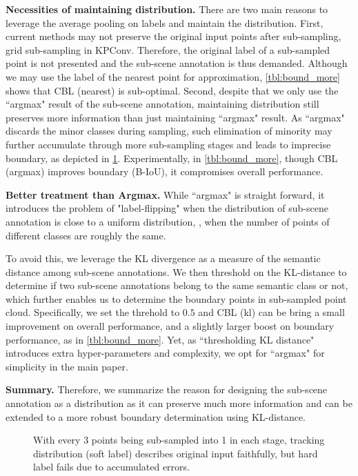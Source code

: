 \documentclass[10pt,twocolumn,letterpaper]{article}
\begin{document}
\noindent\textbf{Necessities of maintaining distribution.}
There are two main reasons to leverage the average pooling on labels and maintain the distribution. First, current methods may not preserve the original input points after sub-sampling, \eg grid sub-sampling in KPConv\cite{kpconv}. Therefore, the original label of a sub-sampled point is not presented and the sub-scene annotation is thus demanded. Although we may use the label of the nearest point for approximation, \cref{tbl:bound_more} shows that CBL (nearest) is sub-optimal. Second, despite that we only use the ``argmax" result of the sub-scene annotation, maintaining distribution still preserves more information than just maintaining ``argmax" result. As ``argmax" discards the minor classes during sampling, such elimination of minority may further accumulate through more sub-sampling stages and leads to imprecise boundary, as depicted in \cref{fig:softvshard}. Experimentally, in \cref{tbl:bound_more}, though CBL (argmax) improves boundary (B-IoU), it compromises overall performance.

\noindent\textbf{Better treatment than Argmax.}
While ``argmax" is straight forward, it introduces the problem of "label-flipping" when the distribution of sub-scene annotation is close to a uniform distribution, \ie, when the number of points of different classes are roughly the same.

To avoid this, we leverage the KL divergence as a measure of the semantic distance among sub-scene annotations. We then threshold on the KL-distance to determine if two sub-scene annotations belong to the same semantic class or not, which further enables us to determine the boundary points in sub-sampled point cloud. Specifically, we set the threhold to $0.5$ and CBL (kl) can be bring a small improvement on overall performance, and a slightly larger boost on boundary performance, as in \cref{tbl:bound_more}. Yet, as ``thresholding KL distance" introduces extra hyper-parameters and complexity, we opt for ``argmax" for simplicity in the main paper.

\noindent\textbf{Summary.}
Therefore, we summarize the reason for designing the sub-scene annotation as a distribution as it can preserve much more information and can be extended to a more robust boundary determination using KL-distance.

\begin{figure}
\centering
{}\caption{With every 3 points being sub-sampled into 1 in each stage, tracking distribution (soft label) describes original input faithfully, but hard label fails due to accumulated errors.}
\label{fig:softvshard}
\end{figure}
\end{document}
